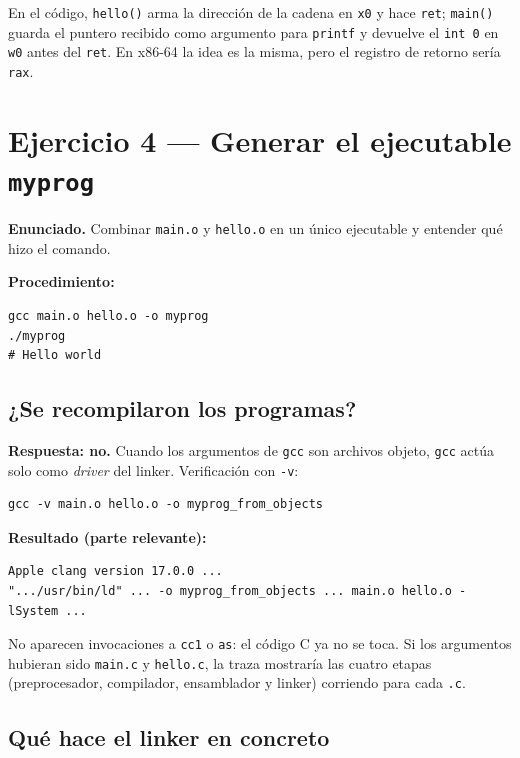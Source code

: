 \documentclass[11pt,a4paper]{article}
\begin{document}
En el código, \texttt{hello()} arma la dirección de la cadena en
\texttt{x0} y hace \texttt{ret}; \texttt{main()} guarda el puntero
recibido como argumento para \texttt{printf} y devuelve el
\texttt{int 0} en \texttt{w0} antes del \texttt{ret}. En x86-64 la
idea es la misma, pero el registro de retorno sería \texttt{rax}.

\section{Ejercicio 4 --- Generar el ejecutable \texttt{myprog}}

\textbf{Enunciado.} Combinar \texttt{main.o} y \texttt{hello.o} en un
único ejecutable y entender qué hizo el comando.

\textbf{Procedimiento:}

\begin{lstlisting}
gcc main.o hello.o -o myprog
./myprog
# Hello world
\end{lstlisting}

\subsection*{¿Se recompilaron los programas?}

\textbf{Respuesta: no.} Cuando los argumentos de \texttt{gcc} son
archivos objeto, \texttt{gcc} actúa solo como \emph{driver} del linker.
Verificación con \texttt{-v}:

\begin{lstlisting}
gcc -v main.o hello.o -o myprog_from_objects
\end{lstlisting}

\textbf{Resultado (parte relevante):}

\begin{lstlisting}[style=asmstyle]
Apple clang version 17.0.0 ...
".../usr/bin/ld" ... -o myprog_from_objects ... main.o hello.o -lSystem ...
\end{lstlisting}

No aparecen invocaciones a \texttt{cc1} o \texttt{as}: el código C
ya no se toca. Si los argumentos hubieran sido \texttt{main.c} y
\texttt{hello.c}, la traza mostraría las cuatro etapas
(preprocesador, compilador, ensamblador y linker) corriendo para cada
\texttt{.c}.

\subsection*{Qué hace el linker en concreto}
\end{document}
